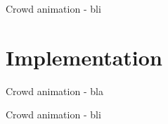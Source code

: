 \documentclass{beamer}
\begin{document}
\begin{frame}{Crowd animation - }
  bli
\end{frame}

\section{Implementation}
\begin{frame}{Crowd animation - }
  bla
\end{frame}

\begin{frame}{Crowd animation - }
  bli
\end{frame}

\bgroup
{}
\begin{frame}[plain]{}
\end{frame}
\egroup
\end{document}
